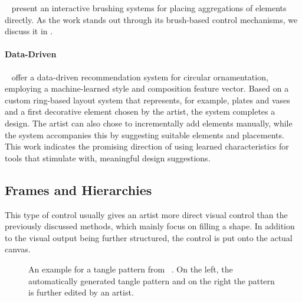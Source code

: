 \citeauthor*{hsu_2020_aef}~\cite{hsu_2020_aef} present an interactive brushing systems for placing aggregations of elements directly. As the work stands out through its brush-based control mechanisms, we discuss it in .


\paragraph*{Data-Driven}
\label{para:analysis_element_arrangements_datadriven}

\citeauthor*{phan_2016_ple}~\cite{phan_2016_ple} offer a data-driven recommendation system for circular ornamentation, employing a machine-learned style and composition feature vector. Based on a custom ring-based layout system that represents, for example, plates and vases and a first decorative element chosen by the artist, the system completes a design. The artist can also chose to incrementally add elements manually, while the system accompanies this by suggesting suitable elements and placements. This work indicates the promising direction of using learned characteristics for tools that stimulate with, \eg meaningful design suggestions.


\subsection{Frames and Hierarchies}
\label{subsec:analysis_frames_and_hierarchies}

 This type of control usually gives an artist more direct visual control than the previously discussed methods, which mainly focus on filling a shape. In addition to the visual output being further structured, the control is put onto the actual canvas.

\begin{figure}[H]
    \centering
    \caption{\label{fig:santoni_2016_ggp}An example for a tangle pattern from \citeauthor*{santoni_2016_ggp}~\cite{santoni_2016_ggp}. On the left, the automatically generated tangle pattern and on the right the pattern is further edited by an artist.}
\end{figure}

